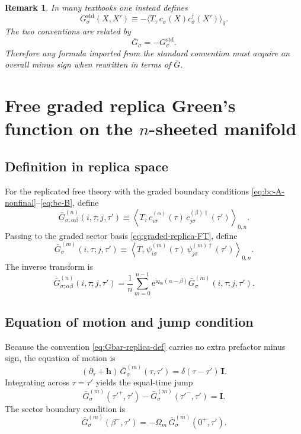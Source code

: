 \documentclass[11pt]{article}
\newtheorem{remark}{Remark}
\newcommand{\e}{\mathrm{e}}
\newcommand{\ii}{\mathrm{i}}
\newcommand{\1}{\mathds{1}}
\newcommand{\bh}{\bm{h}}
\newcommand{\bI}{\bm{I}}
\newcommand{\br}[1]{\left(#1\right)}
\begin{document}
\begin{remark}
In many textbooks one instead defines
\[
G_\sigma^{\mathrm{std}}(X,X')\equiv
-\langle T_\tau\, c_\sigma(X)c_\sigma^\dagger(X')\rangle_0.
\]
The two conventions are related by
\[
\bar G_\sigma=-G_\sigma^{\mathrm{std}}.
\]
Therefore any formula imported from the standard convention must acquire an
overall minus sign when rewritten in terms of $\bar G$.
\end{remark}

\section{Free graded replica Green's function on the $n$-sheeted manifold}

\subsection{Definition in replica space}

For the replicated free theory with the graded boundary conditions
\eqref{eq:bc-A-nonfinal}--\eqref{eq:bc-B}, define
\begin{equation}
\bar G_{\sigma;\alpha\beta}^{(n)}(i,\tau;j,\tau')
\equiv
\left\langle
T_\tau\,
c_{i\sigma}^{(\alpha)}(\tau)\,
c_{j\sigma}^{(\beta)\dagger}(\tau')
\right\rangle_{0,n}.
\label{eq:Gbar-replica-def}
\end{equation}
Passing to the graded sector basis \eqref{eq:graded-replica-FT}, define
\begin{equation}
\bar G_\sigma^{(m)}(i,\tau;j,\tau')
\equiv
\left\langle
T_\tau\,
\psi_{i\sigma}^{(m)}(\tau)\,
\psi_{j\sigma}^{(m)\dagger}(\tau')
\right\rangle_{0,n}.
\label{eq:Gm-def}
\end{equation}
The inverse transform is
\begin{equation}
\bar G_{\sigma;\alpha\beta}^{(n)}(i,\tau;j,\tau')
=
\frac{1}{n}
\sum_{m=0}^{n-1}
\e^{\ii q_m(\alpha-\beta)}
\bar G_\sigma^{(m)}(i,\tau;j,\tau').
\label{eq:G-replica-from-m}
\end{equation}

\subsection{Equation of motion and jump condition}

Because the convention \eqref{eq:Gbar-replica-def} carries no extra prefactor
minus sign, the equation of motion is
\begin{equation}
\boxed{
\br{\partial_\tau+\bh}\,\bar G_\sigma^{(m)}(\tau,\tau')
=
\delta(\tau-\tau')\,\bI.
}
\label{eq:EOM-Gbar}
\end{equation}
Integrating across $\tau=\tau'$ yields the equal-time jump
\begin{equation}
\boxed{
\bar G_\sigma^{(m)}(\tau'^+,\tau')
-
\bar G_\sigma^{(m)}(\tau'^-,\tau')
=
\bI.
}
\label{eq:jump-Gbar}
\end{equation}
The sector boundary condition is
\begin{equation}
\bar G_\sigma^{(m)}(\beta^-,\tau')
=
-\Omega_m\,\bar G_\sigma^{(m)}(0^+,\tau').
\label{eq:G-boundary-sector}
\end{equation}
\end{document}

